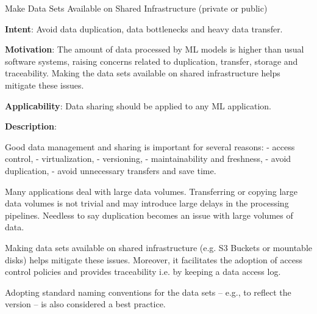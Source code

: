   
  \begin{frame}[plain]{ Make Data Sets Available on Shared Infrastructure (private or public)
 }

  \textbf{Intent}: Avoid data duplication, data bottlenecks and heavy data transfer. 
 

  \textbf{Motivation}: The amount of data processed by ML models is higher than usual software systems, raising concerns related to duplication, transfer, storage and traceability. Making the data sets available on shared infrastructure helps mitigate these issues. 
 

  \textbf{Applicability}: Data sharing should be applied to any ML application.
 

  \textbf{Description}: 

Good data management and sharing is important for several reasons:
- access control,
- virtualization,
- versioning,
- maintainability and freshness,
- avoid duplication,
- avoid unnecessary transfers and save time.


Many applications deal with large data volumes.
Transferring or copying large data volumes is not trivial and may introduce large delays in the processing pipelines.
Needless to say duplication becomes an issue with large volumes of data.


Making data sets available on shared infrastructure (e.g. S3 Buckets or mountable disks) helps mitigate these issues.
Moreover, it facilitates the adoption of access control policies and provides traceability i.e. by keeping a data access log.


Adopting standard naming conventions for the data sets -- e.g., to reflect the version -- is also considered a best practice.


 


  \end{frame}

